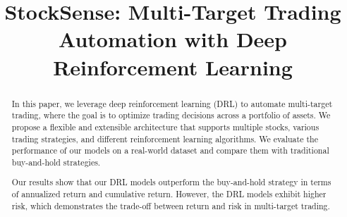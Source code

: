 \documentclass[conference]{IEEEtran}
\begin{document}
\title{StockSense: Multi-Target Trading Automation with Deep Reinforcement Learning}

\author{
  \and
  \and
  \and
  \and
  \and
}

\maketitle

\begin{abstract}

  In this paper, we leverage deep reinforcement learning (DRL) to automate multi-target trading, where the goal is to optimize trading decisions across a portfolio of assets. We propose a flexible and extensible architecture that supports multiple stocks, various trading strategies, and different reinforcement learning algorithms. We evaluate the performance of our models on a real-world dataset and compare them with traditional buy-and-hold strategies.

  Our results show that our DRL models outperform the buy-and-hold strategy in terms of annualized return and cumulative return. However, the DRL models exhibit higher risk, which demonstrates the trade-off between return and risk in multi-target trading.

\end{abstract}
\end{document}

